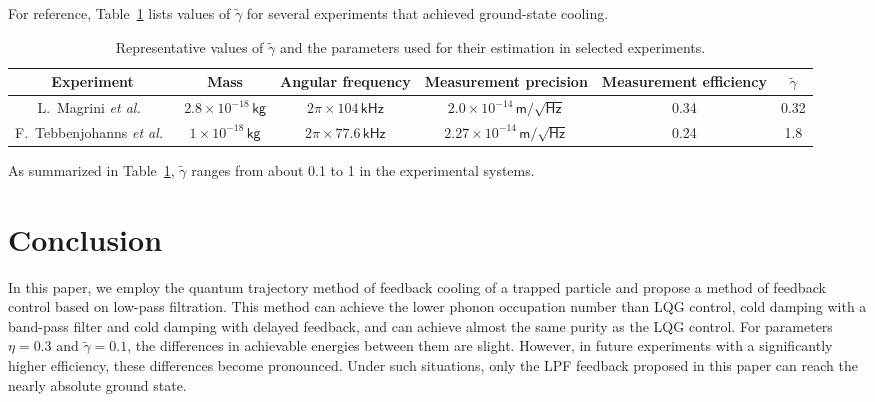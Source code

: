 \documentclass[aps,pra,superscriptaddress,twocolumn
]{revtex4-2}
\newcommand{\majrev}[1]{{#1}}
\begin{document}
{For reference, Table~\ref{tab:tildegamma} lists values of $\tilde{\gamma}$ 
for several experiments that achieved ground-state cooling. 
\begin{table}[tb]
\caption{\label{tab:tildegamma} 
Representative values of $\tilde{\gamma}$ and the parameters 
used for their estimation in selected experiments.}
\begin{ruledtabular}
\begin{tabular}{ccccc|c}
 Experiment & Mass & Angular frequency & 
 Measurement precision & Measurement efficiency & $\tilde \gamma$ \\ \hline
 L.~Magrini \textit{et al.}~\cite{magrini2021real} &
 $2.8\times 10^{-18}\,\mathsf{kg}$ & 
 $2\pi \times 104\,\mathsf{kHz}$ & $2.0\times 10^{-14}\, \mathsf{m/\sqrt{Hz}}$ 
 & 0.34 & 0.32 \\
 F.~Tebbenjohanns \textit{et al.}~\cite{tebbenjohanns2021quantum}&
 $1\times 10^{-18}\,\mathsf{kg}$ & 
 $2\pi \times 77.6\,\mathsf{kHz}$ & $2.27\times 10^{-14}\, 
 \mathsf{m/\sqrt{Hz}}$
 & 0.24 & 1.8
\end{tabular}
\end{ruledtabular}
\end{table}
As summarized in Table~\ref{tab:tildegamma}, 
$\tilde \gamma$ ranges from about 0.1 to 1 in the experimental systems.
}






 
 \section{Conclusion}\label{sec:conclusion}
 
 In this paper, 
 we employ the quantum trajectory method of feedback cooling of a trapped particle
 and propose a method of feedback control based on low-pass filtration.
 This method can achieve the lower phonon occupation number
 than LQG control, cold damping with a band-pass filter 
 and cold damping with delayed feedback, 
 \majrev{and can achieve almost the same purity as the LQG control.} 
 For parameters $\eta =0.3$ and $\tilde \gamma = 0.1$, 
 the differences in achievable energies between them are slight. 
 However, in future experiments with a significantly higher efficiency, 
 these differences become pronounced. 
 Under such situations, 
 only the LPF feedback proposed in this paper can reach the nearly absolute ground state.
 
 
 
\end{document}
